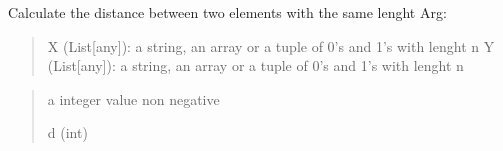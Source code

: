 \documentclass[letterpaper,10pt,english]{sphinxmanual}
\begin{document}
\begin{fulllineitems}
\begin{fulllineitems}
\begin{quote}
\begin{description}
\end{description}\end{quote}

\end{fulllineitems}


\begin{fulllineitems}
\label{\detokenize{index:hammindist.functions.HammingTupla.get_instances_restricted}}
\pysigstartsignatures
\pysiglinewithargsret
{}
{}
{}
\pysigstopsignatures
\end{fulllineitems}


\begin{fulllineitems}
\label{\detokenize{index:hammindist.functions.HammingTupla.hamming_distance}}
\pysigstartsignatures
\pysiglinewithargsret
{}
{\sphinxparamcomma {}}
{}
\pysigstopsignatures
\sphinxAtStartPar
Calculate the distance between two elements with the same lenght
Arg:
\begin{quote}

\sphinxAtStartPar
X (List{[}any{]}): a string, an array or a tuple of 0’s and 1’s with lenght n
Y (List{[}any{]}): a string, an array or a tuple of 0’s and 1’s with lenght n
\end{quote}
\begin{quote}\begin{description}
\sphinxAtStartPar
a integer value non negative

\sphinxAtStartPar
d (int)

\end{description}\end{quote}

\end{fulllineitems}


\end{fulllineitems}

\end{document}
